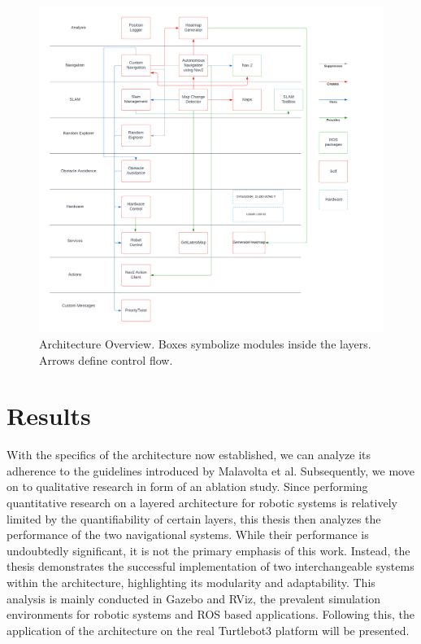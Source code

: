 \documentclass[%
paper=A4,               %
twoside=true,           %
openright,              %
11pt,                   %
bibliography=totoc,     %
titlepage=on,           %
DIV=12,                 %
BCOR=1.5cm,             %
parskip=half,            %
final
]{scrreprt}
\begin{document}
			
	\begin{figure}[H]
		\begin{flushleft}
		\hspace*{-1.5cm} %
		\includegraphics[width=1.3\textwidth]{Graphics/ArchitectureOverview}
		\caption{Architecture Overview. Boxes symbolize modules inside the layers. Arrows define control flow.}
		\label{fig: fig8}
		\end{flushleft}
	\end{figure}
	
	

	\chapter{Results}
	With the specifics of the architecture now established, we can analyze its adherence to the guidelines introduced by Malavolta et al. Subsequently, we move on to qualitative research in form of an ablation study.
	Since performing quantitative research on a layered architecture for robotic systems is relatively limited by the quantifiability of certain layers, this thesis then analyzes the performance of the two navigational systems. While their performance is undoubtedly significant, it is not the primary emphasis of this work. Instead, the thesis demonstrates the successful implementation of two interchangeable systems within the architecture, highlighting its modularity and adaptability. \newline
	 This analysis is mainly conducted in Gazebo and RViz, the prevalent simulation environments for robotic systems and ROS based applications. Following this, the application of the architecture on the real Turtlebot3 platform will be presented.
	 
\end{document}
